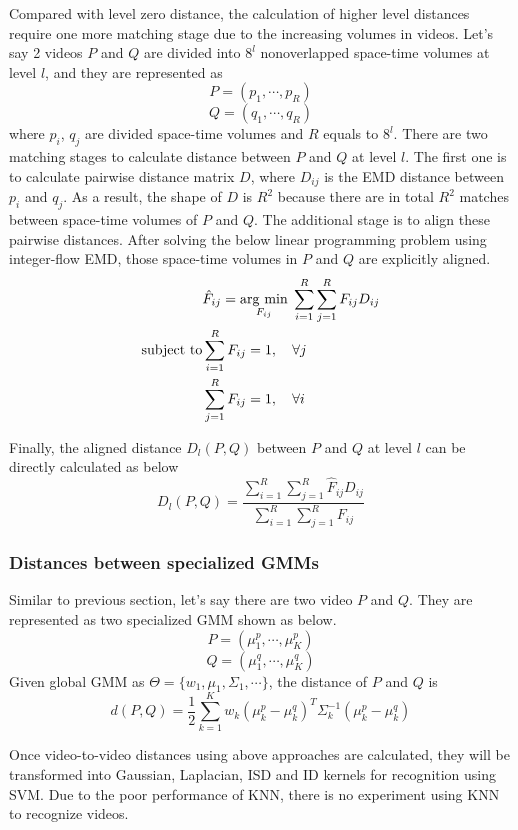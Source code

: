 	\noindent Compared with level zero distance, the calculation of higher level distances require one more matching stage due to the increasing volumes in videos. Let's say 2 videos $P$ and $Q$ are divided into $8^l$ nonoverlapped space-time volumes at level $l$, and they are represented as
	$$P = (p_1, \cdots, p_R)$$
	$$Q = (q_1, \cdots, q_R)$$
	where $p_i$, $q_j$ are divided space-time volumes and $R$ equals to $8^l$. There are two matching stages to calculate distance between $P$ and $Q$ at level $l$. The first one is to calculate pairwise distance matrix $D$, where $D_{ij}$ is the EMD distance between $p_i$ and $q_j$. As a result, the shape of $D$ is $R^2$ because there are in total $R^2$ matches between space-time volumes of $P$ and $Q$. The additional stage is to align these pairwise distances. After solving the below linear programming problem using integer-flow EMD, those space-time volumes in $P$ and $Q$ are explicitly aligned. 
	\begin{eqnarray}
	& \hat F_{ij} = \underset{F_{ij}}{\operatorname{arg}\,\operatorname{min}}\; \sum_{i = 1}^{R} \sum_{j=1}^{R} F_{ij} D_{ij}
	\nonumber \\
	\text{subject to} & \sum_{i=1}^{R} F_{ij} = 1, \quad \forall j \nonumber\\
	&\sum_{j=1}^{R} F_{ij} = 1, \quad \forall i
	\end{eqnarray}

	\noindent Finally, the aligned distance $D_l(P,Q)$ between $P$ and $Q$ at level $l$ can be directly calculated as below
	\begin{equation}
	D_l(P,Q) = \frac{\sum_{i=1}^R \sum_{j=1}^R \hat F_{ij} D_{ij}}{\sum_{i=1}^R \sum_{j=1}^R F_{ij}}
	\end{equation}

	\subsubsection{Distances between specialized GMMs}
	Similar to previous section, let's say there are two video $P$ and $Q$. They are represented as two specialized GMM shown as below.
	$$P = (\mu_1^p, \cdots, \mu_K^p)$$
	$$Q = (\mu_1^q, \cdots, \mu_K^q)$$
	Given global GMM as $\Theta = \{w_1, \mu_1, \Sigma_1, \cdots\}$, the distance of $P$ and $Q$ is
	\begin{equation}
	d(P,Q) = \frac{1}{2} \sum_{k= 1}^{K} w_k (\mu_k^p - \mu_k^q)^T \Sigma_k^{-1} (\mu_k^p - \mu_k^q)
	\end{equation}

\noindent Once video-to-video distances using above approaches are calculated, they will be transformed into Gaussian, Laplacian, ISD and ID kernels for recognition using SVM. Due to the poor performance of KNN, there is no experiment using KNN to recognize videos. 

